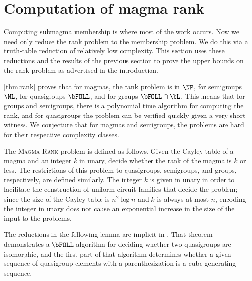 \documentclass{article}
\begin{document}
\section{Computation of magma rank}\label{sec:rank}

%
Computing submagma membership is where most of the work occurs.
Now we need only reduce the rank problem to the membership problem.
We do this via a truth-table reduction of relatively low complexity.
This section uses these reductions and the results of the previous section to prove the upper bounds on the rank problem as advertised in the introduction.

%
\autoref{thm:rank} proves that for magmas, the rank problem is in $\NP$, for semigroups $\NL$, for quasigroups $\bFOLL$, and for groups $\bFOLL \cap \bL$.
This means that for groups and semigroups, there is a polynomial time algorithm for computing the rank, and for quasigroups the problem can be verified quickly given a very short witness.
We conjecture that for magmas and semigroups, the problems are hard for their respective complexity classes.

The \textsc{Magma Rank} problem is defined as follows.
Given the Cayley table of a magma and an integer $k$ in unary, decide whether the rank of the magma is $k$ or less.
The restrictions of this problem to quasigroups, semigroups, and groups, respectively, are defined similarly.
The integer $k$ is given in unary in order to facilitate the construction of uniform circuit families that decide the problem; since the size of the Cayley table is $n^2 \log n$ and $k$ is always at most $n$, encoding the integer in unary does not cause an exponential increase in the size of the input to the problems.

The reductions in the following lemma are implicit in \autocite[Theorem~3.4]{ctw13}.
That theorem demonstrates a $\bFOLL$ algorithm for deciding whether two quasigroups are isomorphic, and the first part of that algorithm determines whether a given sequence of quasigroup elements with a parenthesization is a cube generating sequence.
\end{document}
